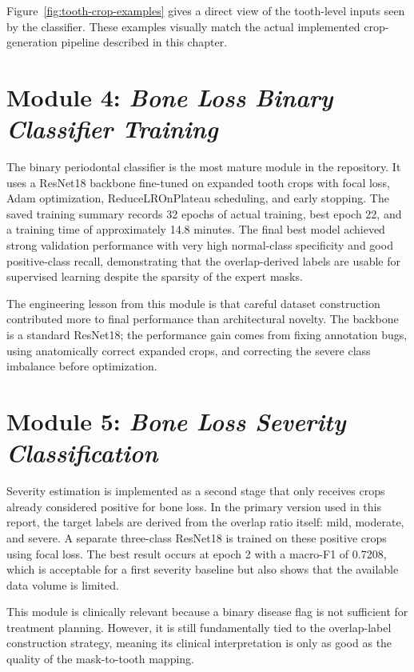 Figure~\ref{fig:tooth-crop-examples} gives a direct view of the tooth-level
inputs seen by the classifier. These examples visually match the actual
implemented crop-generation pipeline described in this chapter.

\section{Module 4: \textit{Bone Loss Binary Classifier Training}}
\label{sec:impl-module4}

The binary periodontal classifier is the most mature module in the repository.
It uses a ResNet18 backbone fine-tuned on expanded tooth crops with focal loss,
Adam optimization, ReduceLROnPlateau scheduling, and early stopping. The saved
training summary records 32 epochs of actual training, best epoch 22, and a
training time of approximately 14.8 minutes. The final best model achieved
strong validation performance with very high normal-class specificity and good
positive-class recall, demonstrating that the overlap-derived labels are
usable for supervised learning despite the sparsity of the expert masks.

The engineering lesson from this module is that careful dataset construction
contributed more to final performance than architectural novelty. The backbone
is a standard ResNet18; the performance gain comes from fixing annotation bugs,
using anatomically correct expanded crops, and correcting the severe class
imbalance before optimization.

\section{Module 5: \textit{Bone Loss Severity Classification}}
\label{sec:impl-module5}

Severity estimation is implemented as a second stage that only receives crops
already considered positive for bone loss. In the primary version used in this
report, the target labels are derived from the overlap ratio itself:
mild, moderate, and severe. A separate three-class ResNet18 is trained on these
positive crops using focal loss. The best result occurs at epoch 2 with a
macro-F1 of 0.7208, which is acceptable for a first severity baseline but also
shows that the available data volume is limited.

This module is clinically relevant because a binary disease flag is not
sufficient for treatment planning. However, it is still fundamentally tied to
the overlap-label construction strategy, meaning its clinical interpretation is
only as good as the quality of the mask-to-tooth mapping.

